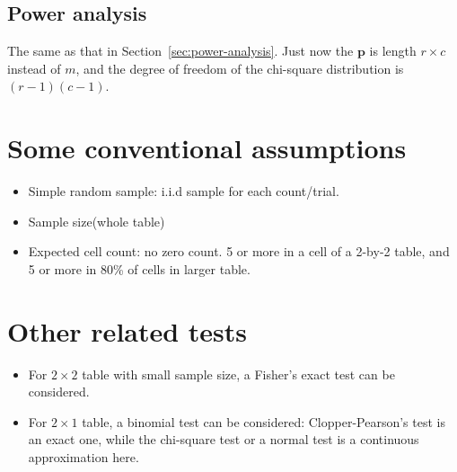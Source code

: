 \documentclass[a4paper,12pt]{article}
\begin{document}
\subsection{Power analysis}
\label{sec:power-analysis-1}

The same as that in Section~\ref{sec:power-analysis}. Just now the $\bm{p}$ is length $r\times c$ instead of $m$, and the degree of freedom of the chi-square distribution is $\left(r - 1\right)\left(c - 1\right)$.

\section{Some conventional assumptions}
\label{sec:some-conv-assumpt}

\begin{itemize}
\item Simple random sample: i.i.d sample for each count/trial.
\item Sample size(whole table)
\item Expected cell count: no zero count. 5 or more in a cell of a 2-by-2 table, and 5 or more in 80\% of cells in larger table.
\end{itemize}

\section{Other related tests}
\label{sec:other-related-tests}

\begin{itemize}
\item For $2\times2$ table with small sample size, a Fisher's exact test can be considered.
\item For $2\times1$ table, a binomial test can be considered: Clopper-Pearson's test is an exact one, while the chi-square test or a normal test is a continuous approximation here.
\end{itemize}




\end{document}
